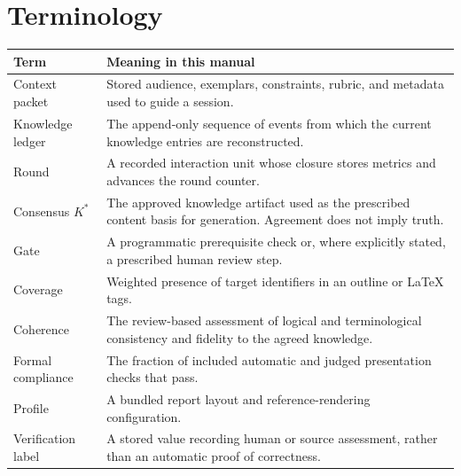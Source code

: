 \documentclass[12pt,a4paper]{article}
\newcommand{\K}{K^{*}}
\begin{document}
\section{Terminology}
\begin{longtable}{@{}P{40mm}P{119mm}@{}}
\toprule
Term & Meaning in this manual\\
\midrule\endhead
Context packet & Stored audience, exemplars, constraints, rubric, and metadata used to guide a session.\\
Knowledge ledger & The append-only sequence of events from which the current knowledge entries are reconstructed.\\
Round & A recorded interaction unit whose closure stores metrics and advances the round counter.\\
Consensus $\K$ & The approved knowledge artifact used as the prescribed content basis for generation. Agreement does not imply truth.\\
Gate & A programmatic prerequisite check or, where explicitly stated, a prescribed human review step.\\
Coverage & Weighted presence of target identifiers in an outline or LaTeX tags.\\
Coherence & The review-based assessment of logical and terminological consistency and fidelity to the agreed knowledge.\\
Formal compliance & The fraction of included automatic and judged presentation checks that pass.\\
Profile & A bundled report layout and reference-rendering configuration.\\
Verification label & A stored value recording human or source assessment, rather than an automatic proof of correctness.\\
\bottomrule
\end{longtable}
\end{document}
